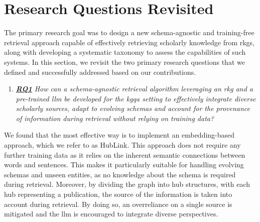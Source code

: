 
\section{Research Questions Revisited}
\label{sec:research_questions_revisited}

The primary research goal was to design a new schema-agnostic and training-free retrieval approach capable of effectively retrieving scholarly knowledge from \glspl{rkg}, along with developing a systematic taxonomy to assess the capabilities of such systems. In this section, we revisit the two primary research questions that we defined and successfully addressed based on our contributions.

\begin{enumerate}[label={}]
    \item \textit{\hyperref[enum:rq1]{\textbf{RQ1}} How can a schema-agnostic retrieval algorithm leveraging an \gls{rkg} and a pre-trained \gls{llm} be developed for the \gls{kgqa} setting to effectively integrate diverse scholarly sources, adapt to evolving schemas and account for the provenance of information during retrieval without relying on training data?} 
\end{enumerate}

We found that the most effective way is to implement an embedding-based approach, which we refer to as HubLink. This approach does not require any further training data as it relies on the inherent semantic connections between words and sentences. This makes it particularly suitable for handling evolving schemas and unseen entities, as no knowledge about the schema is required during retrieval. Moreover, by dividing the graph into hub structures, with each hub representing a publication, the source of the information is taken into account during retrieval. By doing so, an overreliance on a single source is mitigated and the \gls{llm} is encouraged to integrate diverse perspectives.

